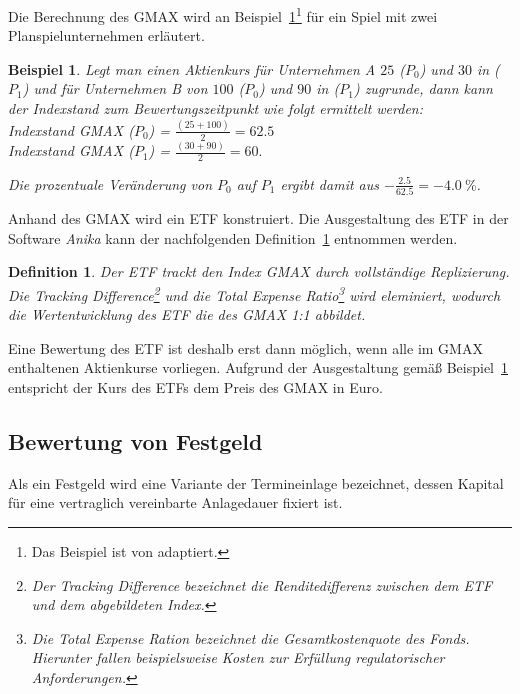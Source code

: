 \documentclass[12pt, a4paper]{article}
\theoremstyle{plain}
\newtheorem{definition}{Definition}
\newtheorem{example}{Beispiel}
\begin{document}
Die Berechnung des \gls{GMAX} wird an Beispiel~\ref{ex:gmax}\footnote{Das Beispiel ist von \textcite[][S.~44]{bodie_investments_2018} adaptiert.} für ein Spiel mit zwei Planspielunternehmen erläutert.

\begin{example}
\label{ex:gmax}
Legt man einen Aktienkurs für Unternehmen A $25$ ($P_0$) und $30$ in ($P_1$) und für Unternehmen B von $100$ ($P_0$) und $90$ in ($P_1$) zugrunde, dann kann der Indexstand zum Bewertungszeitpunkt wie folgt ermittelt werden:\\
Indexstand \gls{GMAX} ($P_0$) = $\frac{(25 + 100)}{2} = 62.5$\\
Indexstand \gls{GMAX} ($P_1$) = $\frac{(30 + 90)}{2} = 60.$

Die prozentuale Veränderung von $P_0$ auf $P_1$ ergibt damit aus $-\frac{2.5}{62.5} = -4.0~\%$.
\end{example}

 Anhand des \gls{GMAX} wird ein \gls{ETF} konstruiert. Die Ausgestaltung des \gls{ETF} in der Software \textit{Anika} kann der nachfolgenden Definition~\ref{def:etf} entnommen werden.
\begin{definition}
	\label{def:etf}
	Der \gls{ETF} trackt den Index \gls{GMAX} durch vollständige Replizierung. Die \textit{Tracking Difference}\footnote{Der \textit{Tracking Difference} bezeichnet die Renditedifferenz zwischen dem \gls{ETF} und dem abgebildeten Index.} und die \textit{Total Expense Ratio}\footnote{Die \textit{Total Expense Ration} bezeichnet die Gesamtkostenquote des Fonds. Hierunter fallen beispielsweise Kosten zur Erfüllung regulatorischer Anforderungen.} wird eleminiert, wodurch die Wertentwicklung des \gls{ETF} die des \gls{GMAX} 1:1 abbildet.
\end{definition}

Eine Bewertung des \gls{ETF} ist deshalb erst dann möglich, wenn alle im \gls{GMAX} enthaltenen Aktienkurse vorliegen. Aufgrund der Ausgestaltung gemäß Beispiel~\ref{def:etf} entspricht der Kurs des \glspl{ETF} dem Preis des \gls{GMAX} in Euro. 

\subsection{Bewertung von Festgeld}
\label{sec:bewertung_von_festgeldern}

Als ein Festgeld wird eine Variante der Termineinlage bezeichnet, dessen Kapital für eine vertraglich vereinbarte Anlagedauer fixiert ist.
\end{document}

